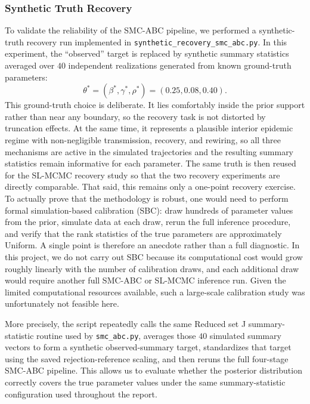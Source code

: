 \documentclass[11pt]{article}
\begin{document}
\subsubsection{Synthetic Truth Recovery}

To validate the reliability of the SMC-ABC pipeline, we performed a synthetic-truth recovery run implemented in \texttt{synthetic\_recovery\_smc\_abc.py}. In this experiment, the ``observed'' target is replaced by synthetic summary statistics averaged over $40$ independent realizations generated from known ground-truth parameters:
\[
\theta^* = (\beta^*, \gamma^*, \rho^*) = (0.25, 0.08, 0.40).
\]
This ground-truth choice is deliberate. It lies comfortably inside the prior support rather than near any boundary, so the recovery task is not distorted by truncation effects. At the same time, it represents a plausible interior epidemic regime with non-negligible transmission, recovery, and rewiring, so all three mechanisms are active in the simulated trajectories and the resulting summary statistics remain informative for each parameter. The same truth is then reused for the SL-MCMC recovery study so that the two recovery experiments are directly comparable. That said, this remains only a one-point recovery exercise. To actually prove that the methodology is robust, one would need to perform formal simulation-based calibration (SBC): draw hundreds of parameter values from the prior, simulate data at each draw, rerun the full inference procedure, and verify that the rank statistics of the true parameters are approximately Uniform. A single point is therefore an anecdote rather than a full diagnostic. In this project, we do not carry out SBC because its computational cost would grow roughly linearly with the number of calibration draws, and each additional draw would require another full SMC-ABC or SL-MCMC inference run. Given the limited computational resources available, such a large-scale calibration study was unfortunately not feasible here.

More precisely, the script repeatedly calls the same Reduced set J summary-statistic routine used by \texttt{smc\_abc.py}, averages those $40$ simulated summary vectors to form a synthetic observed-summary target, standardizes that target using the saved rejection-reference scaling, and then reruns the full four-stage SMC-ABC pipeline. This allows us to evaluate whether the posterior distribution correctly covers the true parameter values under the same summary-statistic configuration used throughout the report.
\end{document}
